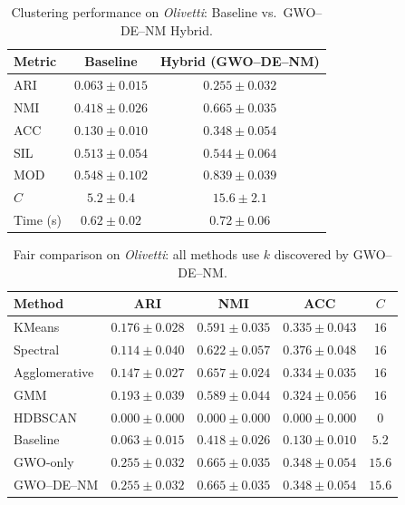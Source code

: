 \begin{table}[htbp]
\centering
\caption{Clustering performance on \textit{Olivetti}: Baseline vs.\ GWO--DE--NM Hybrid.}
\label{tab:olivetti}
\begin{tabular}{lcc}
\toprule
Metric & Baseline & Hybrid (GWO--DE--NM) \\
\midrule
ARI & $0.063 \pm 0.015$ & $\mathbf{0.255 \pm 0.032}$ \\
NMI & $0.418 \pm 0.026$ & $\mathbf{0.665 \pm 0.035}$ \\
ACC & $0.130 \pm 0.010$ & $\mathbf{0.348 \pm 0.054}$ \\
SIL & $0.513 \pm 0.054$ & $\mathbf{0.544 \pm 0.064}$ \\
MOD & $0.548 \pm 0.102$ & $\mathbf{0.839 \pm 0.039}$ \\
\midrule
$C$ & $5.2 \pm 0.4$ & $15.6 \pm 2.1$ \\
Time (s) & $0.62 \pm 0.02$ & $0.72 \pm 0.06$ \\
\bottomrule
\end{tabular}
\end{table}

\begin{table}[htbp]
\centering\small
\caption{Fair comparison on \textit{Olivetti}: all methods use $k$ discovered by GWO--DE--NM.}
\label{tab:fair_olivetti}
\begin{tabular}{lcccc}
\toprule
Method & ARI & NMI & ACC & $C$ \\
\midrule
KMeans & $0.176 \pm 0.028$ & $0.591 \pm 0.035$ & $0.335 \pm 0.043$ & $16$ \\
Spectral & $0.114 \pm 0.040$ & $0.622 \pm 0.057$ & $0.376 \pm 0.048$ & $16$ \\
Agglomerative & $0.147 \pm 0.027$ & $0.657 \pm 0.024$ & $0.334 \pm 0.035$ & $16$ \\
GMM & $0.193 \pm 0.039$ & $0.589 \pm 0.044$ & $0.324 \pm 0.056$ & $16$ \\
HDBSCAN & $0.000 \pm 0.000$ & $0.000 \pm 0.000$ & $0.000 \pm 0.000$ & $0$ \\
\midrule
Baseline & $0.063 \pm 0.015$ & $0.418 \pm 0.026$ & $0.130 \pm 0.010$ & $5.2$ \\
GWO-only & $\mathbf{0.255 \pm 0.032}$ & $0.665 \pm 0.035$ & $0.348 \pm 0.054$ & $15.6$ \\
GWO--DE--NM & $0.255 \pm 0.032$ & $0.665 \pm 0.035$ & $0.348 \pm 0.054$ & $15.6$ \\
\bottomrule
\end{tabular}
\end{table}

